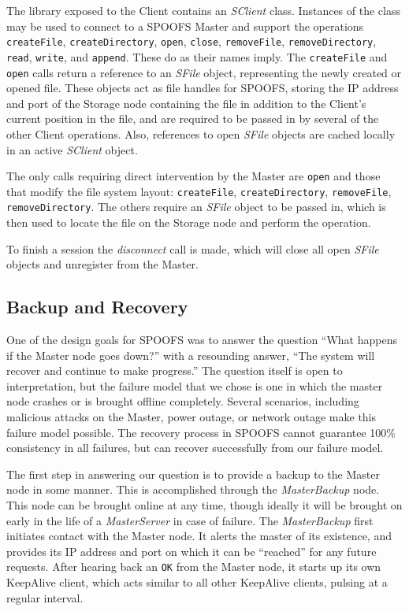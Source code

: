 The library exposed to the Client contains an \textit{SClient} class. Instances of the class may be used to connect to a SPOOFS Master and support the operations \texttt{createFile}, \texttt{createDirectory}, \texttt{open}, \texttt{close}, \texttt{removeFile}, \texttt{removeDirectory}, \texttt{read}, \texttt{write}, and \texttt{append}. These do as their names imply. The \texttt{createFile} and \texttt{open} calls return a reference to an \textit{SFile} object, representing the newly created or opened file. These objects act as file handles for SPOOFS, storing the IP address and port of the Storage node containing the file in addition to the Client's current position in the file, and are required to be passed in by several of the other Client operations. Also, references to open \textit{SFile} objects are cached locally in an active \textit{SClient} object.

The only calls requiring direct intervention by the Master are \texttt{open} and those that modify the file system layout: \texttt{createFile}, \texttt{createDirectory}, \texttt{removeFile}, \texttt{removeDirectory}. The others require an \textit{SFile} object to be passed in, which is then used to locate the file on the Storage node and perform the operation.

To finish a session the \textit{disconnect} call is made, which will close all open \textit{SFile} objects and unregister from the Master.

\subsection{Backup and Recovery}

One of the design goals for SPOOFS was to answer the question ``What happens if the Master node goes down?'' with a resounding answer, ``The system will recover and continue to make progress.''  The question itself is open to interpretation, but the failure model that we chose is one in which the master node crashes or is brought offline completely.  Several scenarios, including malicious attacks on the Master, power outage, or network outage make this failure model possible.  The recovery process in SPOOFS cannot guarantee 100\% consistency in all failures, but can recover successfully from our failure model.

The first step in answering our question is to provide a backup to the Master node in some manner.  This is accomplished through the \textit{MasterBackup} node.  This node can be brought online at any time, though ideally it will be brought on early in the life of a \textit{MasterServer} in case of failure.  The \textit{MasterBackup} first initiates contact with the Master node.  It alerts the master of its existence, and provides its IP address and port on which it can be ``reached'' for any future requests.  After hearing back an \texttt{OK} from the Master node, it starts up its own KeepAlive client, which acts similar to all other KeepAlive clients, pulsing at a regular interval.

